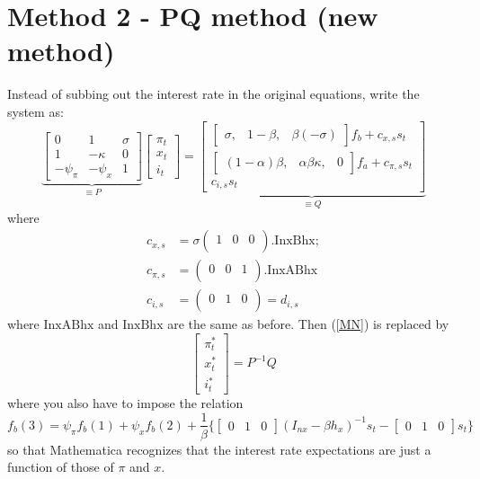\documentclass[11pt]{article}
\renewcommand{\[}{\begin{equation}}
\renewcommand{\]}{\end{equation}}
\begin{document}
\section{Method 2 - PQ method (new method)}
Instead of subbing out the interest rate in the original equations, write the system as:
\begin{equation}
\underbrace{\begin{bmatrix} 0& 1&  \sigma \\ 1& -\kappa & 0 \\ -\psi_{\pi} & -\psi_{x} & 1 \end{bmatrix}}_{\equiv P}\begin{bmatrix} \pi_t \\ x_t \\i_t \end{bmatrix} = \underbrace{\begin{bmatrix} \begin{bmatrix}\sigma, &1-\beta, &\beta  (-\sigma )\end{bmatrix}f_b +c_{x,s} s_t \\ \begin{bmatrix}(1-\alpha ) \beta ,&\alpha  \beta  \kappa ,&0\end{bmatrix}f_a +c_{\pi,s} s_t \\ c_{i,s} s_t \end{bmatrix}}_{\equiv Q}
\end{equation}
where 
\begin{align}
c_{x,s} & = \sigma  \left(
\begin{array}{ccc}
 1 & 0 & 0 \\
\end{array}
\right).\text{InxBhx};\\
c_{\pi,s} & = \left(
\begin{array}{ccc}
 0 & 0 & 1 \\
\end{array}
\right).\text{InxABhx}\\
c_{i,s} & = \left(
\begin{array}{ccc}
 0 & 1 & 0 \\
\end{array}
\right) = d_{i,s}
\end{align}
where $\text{InxABhx}$ and $\text{InxBhx}$ are the same as before.
Then (\ref{MN}) is replaced by 
\begin{equation}
\begin{bmatrix} \pi_t^* \\ x_t^* \\ i_t^* \end{bmatrix} = P^{-1}Q \label{PQ}
\end{equation}
where you also have to impose the relation
\begin{equation}
f_b(3) = \psi_{\pi}f_b(1) + \psi_{x}f_b(2) + \frac{1}{\beta}\{ \begin{bmatrix} 0 &1 & 0  \end{bmatrix}(I_{nx}-\beta h_x)^{-1} s_t - \begin{bmatrix} 0 &1 & 0  \end{bmatrix}s_t  \} \tag{*}
\end{equation}
so that Mathematica recognizes that the interest rate expectations are just a function of those of $\pi$ and $x$. 
\end{document}
